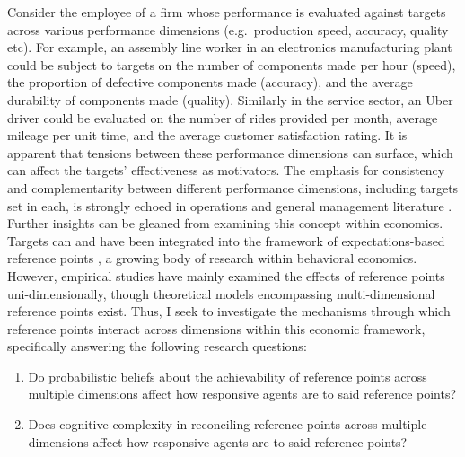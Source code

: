 \documentclass[12pt, letterpaper, DIV=11, numbers=noendperiod]{article}
\providecommand{\tightlist}{\setlength{\itemsep}{0pt}\setlength{\parskip}{0pt}}
\begin{document}
Consider the employee of a firm whose performance is evaluated against targets across various performance dimensions (e.g.~production speed, accuracy, quality etc). For example, an assembly line worker in an electronics manufacturing plant could be subject to targets on the number of components made per hour (speed), the proportion of defective components made (accuracy), and the average durability of components made (quality). Similarly in the service sector, an Uber driver could be evaluated on the number of rides provided per month, average mileage per unit time, and the average customer satisfaction rating. It is apparent that tensions between these performance dimensions can surface, which can affect the targets' effectiveness as motivators. The emphasis for consistency and complementarity between different performance dimensions, including targets set in each, is strongly echoed in operations and general management literature \parencite[e.g.][]{hayes.1984.restoringour,hayes.1978.howshould,skinner.1974.focusedfactory,skinner.1996.manufacturingstrategy,swamidass.2000.focusedfactory}. Further insights can be gleaned from examining this concept within economics. Targets can and have been integrated into the framework of expectations-based reference points \parencite{heath.1999.goalsreference,vonrechenberg.2016.goalsreference}, a growing body of research within behavioral economics. However, empirical studies have mainly examined the effects of reference points uni-dimensionally, though theoretical models encompassing multi-dimensional reference points exist. Thus, I seek to investigate the mechanisms through which reference points interact across dimensions within this economic framework, specifically answering the following research questions:

\begin{enumerate}
\def\labelenumi{\arabic{enumi}.}
\tightlist
\item
  Do probabilistic beliefs about the achievability of reference points across multiple dimensions affect how responsive agents are to said reference points?
\item
  Does cognitive complexity in reconciling reference points across multiple dimensions affect how responsive agents are to said reference points?
\end{enumerate}
\end{document}
